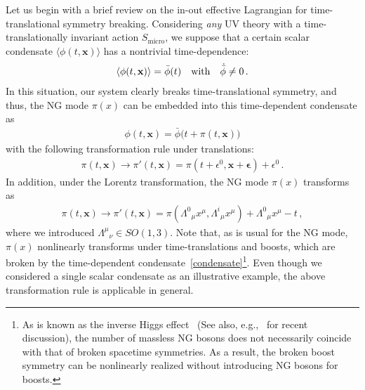 \documentclass[a4paper,11pt]{article}
\begin{document}
Let us begin with a brief review on the in-out effective Lagrangian 
for time-translational symmetry breaking. 
Considering \textit{any} UV theory with a time-translationally invariant action $S_{\mathrm{micro}}$,
we suppose that a certain scalar condensate 
$\langle\phi(t,\mathbf{x})\rangle$ has a nontrivial time-dependence:
\begin{align}
\label{condensate}
 \langle\phi(t,\mathbf{x})\rangle
 = \bar{\phi}(t)
\quad
{\rm with}
\quad
\dot{\bar{\phi}}\neq0
\,.
\end{align}
In this situation, our system clearly breaks time-translational symmetry,
and thus, 
the NG mode $\pi(x)$ can be embedded into this time-dependent condensate as
\begin{align}
\label{embedding}
\phi(t,\mathbf{x})=\bar{\phi} \big(t+\pi(t,\mathbf{x}) \big)
\end{align}
with the following transformation rule under translations:
\begin{align}
 \label{translations}
 \pi(t,\mathbf{x})
 \to \pi'(t,\mathbf{x})
 = \pi(t+\epsilon^0,\mathbf{x}+\boldsymbol{\epsilon})+\epsilon^0\,.
\end{align}
In addition, under the Lorentz transformation, the NG mode $\pi(x)$ transforms as
\begin{align}
 \label{Lorentz}
 \pi(t,\mathbf{x})
 \to \pi' (t,\mathbf{x}) 
 = \pi \left(\Lambda^0{}_\mu x^\mu,\Lambda^i{}_\mu x^\mu\right)+\Lambda^0{}_\mu x^\mu-t
\,,
\end{align}
where we introduced $\Lambda^\mu{}_\nu\in SO(1,3)$.
Note that, as is usual for the NG mode,
$\pi(x)$ nonlinearly transforms under time-translations and boosts, 
which are broken by the time-dependent condensate~\eqref{condensate}\footnote{
As is known as the inverse Higgs effect~\cite{Ivanov:1975zq} 
(See also, e.g.,~\cite{Nicolis:2013sga,Endlich:2013vfa,Brauner:2014aha,Hidaka:2014fra} for recent discussion), 
the number of massless NG bosons does not necessarily coincide with 
that of broken spacetime symmetries. As a result, 
the broken boost symmetry can be nonlinearly realized 
without introducing NG bosons for boosts.}.
Even though we considered a single scalar condensate as an illustrative example,
the above transformation rule is applicable in general.
\end{document}
